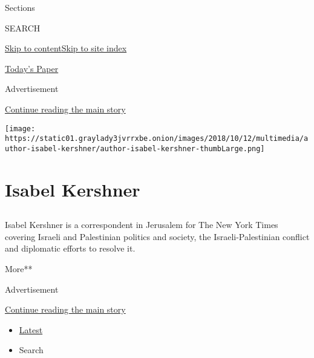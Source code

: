 Sections

SEARCH

\protect\hyperlink{site-content}{Skip to
content}\protect\hyperlink{site-index}{Skip to site index}

\href{https://myaccount.nytimes3xbfgragh.onion/auth/login?response_type=cookie\&client_id=vi}{}

\href{https://www.nytimes3xbfgragh.onion/section/todayspaper}{Today's
Paper}

Advertisement

\protect\hyperlink{after-top}{Continue reading the main story}

\texttt{[image: https://static01.graylady3jvrrxbe.onion/images/2018/10/12/multimedia/author-isabel-kershner/author-isabel-kershner-thumbLarge.png]}

\hypertarget{isabel-kershner}{%
\section{Isabel Kershner}\label{isabel-kershner}}

\subsection{}

Isabel Kershner is a correspondent in Jerusalem for The New York Times
covering Israeli and Palestinian politics and society, the
Israeli-Palestinian conflict and diplomatic efforts to resolve it.

More**

Advertisement

\protect\hyperlink{after-mid1}{Continue reading the main story}

\begin{itemize}
\tightlist
\item
  \protect\hyperlink{stream-panel}{Latest}
\item
  Search
\end{itemize}


